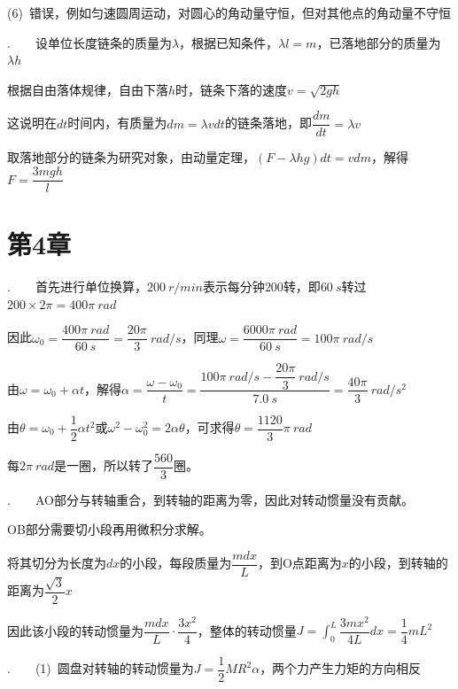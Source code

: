 (6)~错误，例如匀速圆周运动，对圆心的角动量守恒，但对其他点的角动量不守恒

\noindent\hdashrule{\textwidth}{1pt}{1pt}

.~~~~设单位长度链条的质量为$\lambda$，根据已知条件，$\lambda l=m$，已落地部分的质量为$\lambda h$

根据自由落体规律，自由下落$h$时，链条下落的速度$v=\sqrt{2gh}$

这说明在$dt$时间内，有质量为$dm=\lambda vdt$的链条落地，即$\dfrac{dm}{dt}=\lambda v$

取落地部分的链条为研究对象，由动量定理，$(F-\lambda hg)dt=vdm$，解得$F=\dfrac{3mgh}{l}$

\noindent\hdashrule{\textwidth}{1pt}{1pt}

\section*{第4章}

.~~~~首先进行单位换算，$\SI{200}{r/min}$表示每分钟$200$转，即$\SI{60}{s}$转过$200\times 2\pi=400\pi~\unit{rad}$ 

因此$\omega_0=\dfrac{400\pi~\unit{rad}}{\SI{60}{s}}=\dfrac{20\pi}{3}~\unit{rad/s}$，同理$\omega=\dfrac{6000\pi~\unit{rad}}{\SI{60}{s}}=100\pi~\unit{rad/s}$

由$\omega=\omega_0+\alpha t$，解得$\alpha=\dfrac{\omega-\omega_0}{t}=\dfrac{100\pi~\unit{rad/s}-\dfrac{20\pi}{3}~\unit{rad/s}}{\SI{7.0}{s}}=\dfrac{40\pi}{3}~\unit{rad/s^2}$

由$\theta=\omega_0+\dfrac{1}{2}\alpha t^2$或$\omega^2-\omega_0^2=2\alpha \theta$，可求得$\theta=\dfrac{1120}{3}\pi~\unit{rad}$

每$2\pi~\unit{rad}$是一圈，所以转了$\dfrac{560}{3}$圈。

\noindent\hdashrule{\textwidth}{1pt}{1pt}

.~~~~AO部分与转轴重合，到转轴的距离为零，因此对转动惯量没有贡献。

OB部分需要切小段再用微积分求解。

将其切分为长度为$dx$的小段，每段质量为$\dfrac{mdx}{L}$，到O点距离为$x$的小段，到转轴的距离为$\dfrac{\sqrt{3}}{2}x$

因此该小段的转动惯量为$\dfrac{mdx}{L}\cdot \dfrac{3x^2}{4}$，整体的转动惯量$J=\displaystyle\int_0^L{\dfrac{3mx^2}{4L}dx}=\dfrac{1}{4}mL^2$

\noindent\hdashrule{\textwidth}{1pt}{1pt}

.~~~~(1)~圆盘对转轴的转动惯量为$J=\dfrac{1}{2}MR^2\alpha$，两个力产生力矩的方向相反

